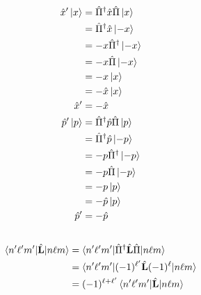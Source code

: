 \documentclass{article}
\renewcommand{\vec}[1]{\boldsymbol{\mathbf{#1}}}
\newcommand{\uvec}[1]{\hat{\vec{#1}}}
\begin{document}
\subsection{}

\begin{align*}
  \hat{x}' \ket{x} & = \hat{\Pi}^\dagger \hat{x} \hat{\Pi} \ket{x} \\
                   & = \hat{\Pi}^\dagger \hat{x} \ket{-x}          \\
                   & = -x \hat{\Pi}^\dagger \ket{-x}               \\
                   & = -x \hat{\Pi} \ket{-x}                       \\
                   & = -x \ket{x}                                  \\
                   & = -\hat{x} \ket{x}                            \\
  \hat{x}'         & = -\hat{x}                                    \\
  \hat{p}' \ket{p} & = \hat{\Pi}^\dagger \hat{p} \hat{\Pi} \ket{p} \\
                   & = \hat{\Pi}^\dagger \hat{p} \ket{-p}          \\
                   & = -p \hat{\Pi}^\dagger \ket{-p}               \\
                   & = -p \hat{\Pi} \ket{-p}                       \\
                   & = -p \ket{p}                                  \\
                   & = -\hat{p} \ket{p}                            \\
  \hat{p}'         & = -\hat{p}
\end{align*}

\subsection{}

\begin{align*}
  \braket{n' \ell' m' | \uvec{L} | n \ell m} & = \braket{n' \ell' m' | \hat{\Pi}^\dagger \uvec{L} \hat{\Pi} | n \ell m} \\
                                             & = \braket{n' \ell' m' | (-1)^{\ell'} \uvec{L} (-1)^\ell | n \ell m}      \\
                                             & = (-1)^{\ell + \ell'} \braket{n' \ell' m' | \uvec{L} | n \ell m}
\end{align*}
\end{document}
